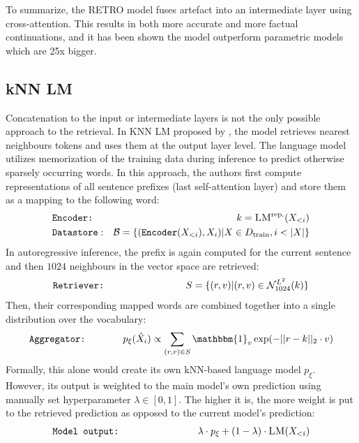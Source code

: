 To summarize, the RETRO model fuses artefact into an intermediate layer using cross-attention. This results in both more accurate and more factual continuations, and it has been shown the model outperform parametric models which are 25x bigger.


\subsection{kNN LM}
Concatenation to the input or intermediate layers is not the only possible approach to the retrieval. In KNN LM proposed by \citet{khandelwal2019generalization}, the model retrieves nearest neighbours tokens and uses them at the output layer level.
The language model utilizes memorization of the training data during inference to predict otherwise sparsely occurring words.
In this approach, the authors first compute representations of all sentence prefixes (last self-attention layer) and store them as a mapping to the following word:
\begin{align}
& \texttt{Encoder:} & k = \textsc{LM}^\text{rep.}(X_{<i}) \\
& \texttt{Datastore}: & \mathcal{B} = \{ (\texttt{Encoder}(X_{<i}), X_{i}) |X\in D_\text{train}, i < |X| \}
\end{align}
In autoregressive inference, the prefix is again computed for the current sentence and then $1024$ neighbours in the vector space are retrieved:
\begin{align}
& \texttt{Retriever:} & \hspace{2.6cm} S = \{(r, v) |(r, v) \in \mathcal{N}_{1024}^{L^2}(k)\}
\end{align}
Then, their corresponding mapped words are combined together into a single distribution over the vocabulary:
\begin{align}
& \texttt{Aggregator:} & \hspace{1cm} p_\xi(\hat{X}_i) \propto \sum_{(r,v) \in S} \mathbbm{1}_{v} \exp(-||r-k||_2 \cdot v)
\end{align}
Formally, this alone would create its own kNN-based language model $p_\xi$.
However, its output is weighted to the main model's own prediction using manually set hyperparameter $\lambda \in [0,1]$.
The higher it is, the more weight is put to the retrieved prediction as opposed to the current model's prediction:
\begin{align}
& \texttt{Model output:} & \hspace{2.5cm} \lambda \cdot p_\xi + (1-\lambda) \cdot \textsc{LM}(X_{<i}) \label{eq:knn_lm_final}
\end{align}

